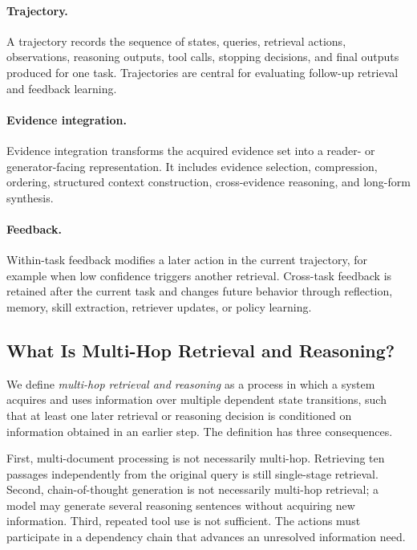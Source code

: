 \paragraph{Trajectory.}
A trajectory records the sequence of states, queries, retrieval actions, observations, reasoning outputs, tool calls, stopping decisions, and final outputs produced for one task. Trajectories are central for evaluating follow-up retrieval and feedback learning.

\paragraph{Evidence integration.}
Evidence integration transforms the acquired evidence set into a reader- or generator-facing representation. It includes evidence selection, compression, ordering, structured context construction, cross-evidence reasoning, and long-form synthesis.

\paragraph{Feedback.}
Within-task feedback modifies a later action in the current trajectory, for example when low confidence triggers another retrieval. Cross-task feedback is retained after the current task and changes future behavior through reflection, memory, skill extraction, retriever updates, or policy learning.

\subsection{What Is Multi-Hop Retrieval and Reasoning?}
\label{subsec:definition}

We define \emph{multi-hop retrieval and reasoning} as a process in which a system acquires and uses information over multiple dependent state transitions, such that at least one later retrieval or reasoning decision is conditioned on information obtained in an earlier step. The definition has three consequences.

First, multi-document processing is not necessarily multi-hop. Retrieving ten passages independently from the original query is still single-stage retrieval. Second, chain-of-thought generation is not necessarily multi-hop retrieval; a model may generate several reasoning sentences without acquiring new information. Third, repeated tool use is not sufficient. The actions must participate in a dependency chain that advances an unresolved information need.

